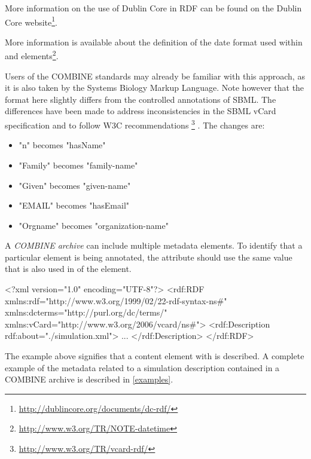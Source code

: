 \begin{itemize}
{	More information on the use of Dublin Core in RDF can be found 
	on the Dublin Core website{\footnote[3]{\url{http://dublincore.org/documents/dc-rdf/}}}. } 
	
	More information is available about the definition of the date format used within  and 
	 elements{\footnote[4]{\url{http://www.w3.org/TR/NOTE-datetime}}}.

\end{itemize}
\pagebreak
Users of the COMBINE standards may already be familiar with this 
approach, as it is also taken by the Systems Biology Markup Language. 
Note however that the format here slightly differs from the controlled 
annotations of SBML. The differences have been made to address inconsistencies 
in the SBML vCard specification and to follow W3C recommendations {\footnote[4]{\url{http://www.w3.org/TR/vcard-rdf/}}} . The changes 
are:

\begin{itemize}
	\item  "n" becomes "hasName" 
	\item  "Family" becomes "family-name" 
	\item  "Given" becomes "given-name" 
	\item  "EMAIL" becomes "hasEmail" 
	\item  "Orgname" becomes "organization-name" 
\end{itemize}

A \textit{COMBINE archive} can include multiple metadata elements. To 
identify that a particular \Content element is being annotated, the 
 attribute should use the same value that is also used 
in  of the \Content element. 


\begin{example}
<?xml version="1.0" encoding="UTF-8"?>
<rdf:RDF xmlns:rdf="http://www.w3.org/1999/02/22-rdf-syntax-ns#" 
         xmlns:dcterms="http://purl.org/dc/terms/" 
				 xmlns:vCard="http://www.w3.org/2006/vcard/ns#">
   <rdf:Description rdf:about="./simulation.xml">
   ...
	 </rdf:Description>
</rdf:RDF>
\end{example}

The example above signifies that a content element with 
 is described. A complete example of 
the metadata related to a simulation description contained in a COMBINE 
archive is described in \ref{examples}. 


